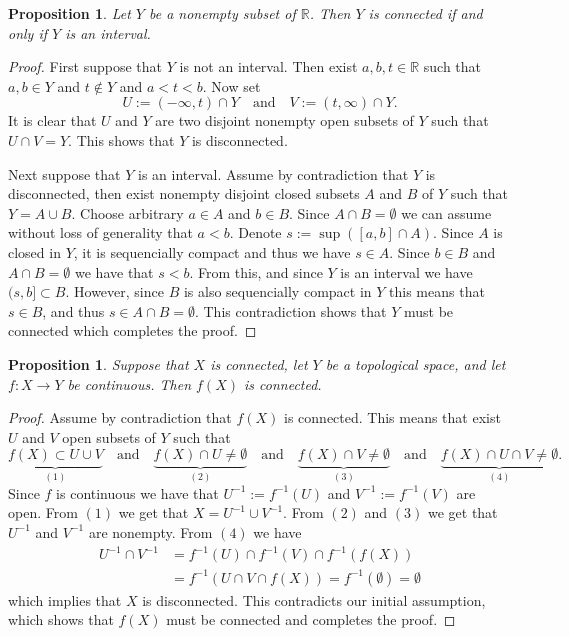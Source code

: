 \documentclass[11pt,a4paper]{article}
\theoremstyle{definition}
\theoremstyle{plain}
\newtheorem{proposition}[theorem]{Proposition}
\newcommand{\R}{\mathbb{R}}
\newcommand{\tand}{\quad \text{and} \quad}
\begin{document}
  \begin{proposition}\label{prp:R-connected-interval}
    Let $Y$ be a nonempty subset of $\R$.
    Then $Y$ is connected if and only if $Y$ is an interval.
  \end{proposition}
  \begin{proof}
    First suppose that $Y$ is not an interval. Then exist $a,b,t \in \R$
    such that $a,b \in Y$ and $t \notin Y$ and $a < t < b$.
    Now set
    \[
      U := (-\infty,t) \cap Y \tand V := (t,\infty) \cap Y.
    \]
    It is clear that $U$ and $Y$ are two disjoint nonempty open subsets of $Y$
    such that $U \cap V = Y$. This shows that $Y$ is disconnected.

    Next suppose that $Y$ is an interval.
    Assume by contradiction that $Y$ is disconnected, then exist nonempty
    disjoint closed subsets $A$ and $B$ of $Y$ such that $Y = A \cup B$.
    Choose arbitrary $a \in A$ and $b \in B$.
    Since $A \cap B = \emptyset$ we can assume without loss of generality
    that $a < b$. Denote $s := \sup([a,b] \cap A)$.
    Since $A$ is closed in $Y$, it is sequencially compact and thus we have 
    $s \in A$.
    Since $b \in B$ and $A \cap B = \emptyset$ we have that $s < b$.
    From this, and since $Y$ is an interval we have $(s,b] \subset B$.
    However, since $B$ is also sequencially compact in $Y$ this means
    that $s \in B$, and thus $s \in A \cap B = \emptyset$.
    This contradiction shows that $Y$ must be connected
    which completes the proof.
  \end{proof}

  \begin{proposition}\label{prp:connected-continuous}
    Suppose that $X$ is connected,
    let $Y$ be a topological space,
    and let $f \colon X \to Y$ be continuous.
    Then $f(X)$ is connected.
  \end{proposition}
  \begin{proof}
    Assume by contradiction that $f(X)$ is connected.
    This means that exist $U$ and $V$ open subsets of $Y$ such that
    \[
      \underbrace{f(X) \subset U \cup V}_{(1)} \tand
      \underbrace{f(X) \cap U \neq \emptyset}_{(2)} \tand
      \underbrace{f(X) \cap V \neq \emptyset}_{(3)} \tand
      \underbrace{f(X) \cap U \cap V \neq \emptyset}_{(4)}.
    \]
    Since $f$ is continuous we have that $U^{-1} := f^{-1}(U)$ and
    $V^{-1} := f^{-1}(V)$ are open.
    From $(1)$ we get that $X = U^{-1} \cup V^{-1}$.
    From $(2)$ and $(3)$ we get that $U^{-1}$ and $V^{-1}$ are nonempty.
    From $(4)$ we have
    \begin{align*}
      U^{-1} \cap V^{-1} &=
      f^{-1}(U) \cap f^{-1}(V) \cap f^{-1}(f(X)) \\
                         &= f^{-1}(U \cap V \cap f(X))
                          = f^{-1}(\emptyset) = \emptyset
    \end{align*}
    which implies that $X$ is disconnected.
    This contradicts our initial assumption,
    which shows that $f(X)$ must be connected and completes the proof.
  \end{proof}
\end{document}
